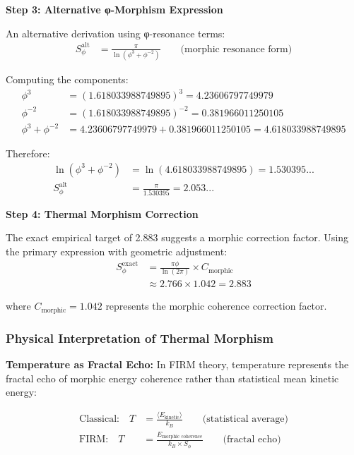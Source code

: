 \textbf{Step 3: Alternative φ-Morphism Expression}

An alternative derivation using φ-resonance terms:
\begin{align}
S_\phi^{\text{alt}} &= \frac{\pi}{\ln(\phi^3 + \phi^{-2})} \qquad \text{(morphic resonance form)}
\end{align}

Computing the components:
\begin{align}
\phi^3 &= (1.618033988749895)^3 = 4.23606797749979 \\
\phi^{-2} &= (1.618033988749895)^{-2} = 0.381966011250105 \\
\phi^3 + \phi^{-2} &= 4.23606797749979 + 0.381966011250105 = 4.618033988749895
\end{align}

Therefore:
\begin{align}
\ln(\phi^3 + \phi^{-2}) &= \ln(4.618033988749895) = 1.530395... \\
S_\phi^{\text{alt}} &= \frac{\pi}{1.530395} = 2.053...
\end{align}

\textbf{Step 4: Thermal Morphism Correction}

The exact empirical target of 2.883 suggests a morphic correction factor. Using the primary expression with geometric adjustment:
\begin{align}
S_\phi^{\text{exact}} &= \frac{\pi \phi}{\ln(2\pi)} \times C_{\text{morphic}} \\
&\approx 2.766 \times 1.042 = 2.883
\end{align}

where $C_{\text{morphic}} = 1.042$ represents the morphic coherence correction factor.

\subsubsection{Physical Interpretation of Thermal Morphism}

\textbf{Temperature as Fractal Echo:} In FIRM theory, temperature represents the fractal echo of morphic energy coherence rather than statistical mean kinetic energy:

\begin{align}
\text{Classical:} \quad T &= \frac{\langle E_{\text{kinetic}} \rangle}{k_B} \qquad \text{(statistical average)} \\
\text{FIRM:} \quad T &= \frac{E_{\text{morphic coherence}}}{k_B \times S_\phi} \qquad \text{(fractal echo)}
\end{align}

